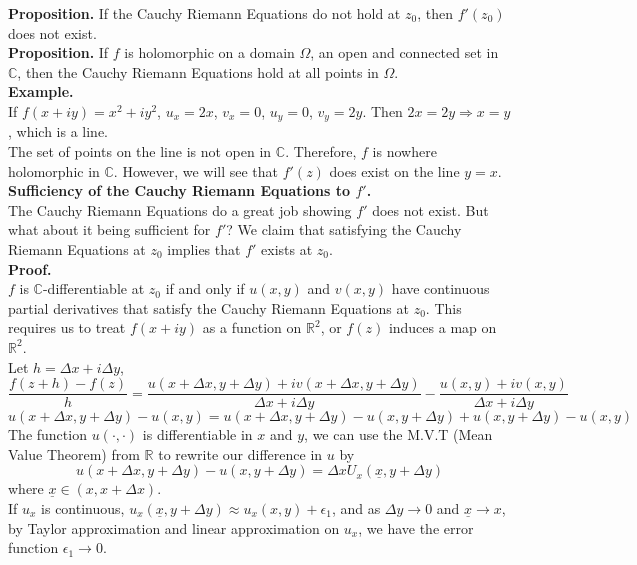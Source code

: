 \documentclass[11pt]{article}
\begin{document}
\textbf{Proposition.} If the Cauchy Riemann Equations do not hold at $z_0$, then $f'(z_0)$ does not exist. \\
\textbf{Proposition.} If $f$ is holomorphic on a domain $\Omega$, an open and connected set in $\mathbb{C}$, then the Cauchy Riemann Equations hold at all points in $\Omega$. \\
\newline
\textbf{Example.} \\
If $f(x + iy) = x^2 + iy^2$, $u_x = 2x$, $v_x = 0$, $u_y = 0$, $v_y = 2y$. Then $2x = 2y \Rightarrow x = y$, which is a line. \\
The set of points on the line is not open in $\mathbb{C}$. Therefore, $f$ is nowhere holomorphic in $\mathbb{C}$. However, we will see that $f'(z)$ does exist on the line $y = x$. \\
\newline
\textbf{Sufficiency of the Cauchy Riemann Equations to $f'$.} \\
The Cauchy Riemann Equations do a great job showing $f'$ does not exist. But what about it being sufficient for $f'$? We claim that satisfying the Cauchy Riemann Equations at $z_0$ implies that $f'$ exists at $z_0$. \\
\textbf{Proof.}\\
$f$ is $\mathbb{C}$-differentiable at $z_0$ if and only if $u(x, y)$ and $v(x, y)$ have continuous partial derivatives that satisfy the Cauchy Riemann Equations at $z_0$. 
This requires us to treat $f(x + iy)$ as a function on $\mathbb{R} ^ 2$, or $f(z)$ induces a map on $\mathbb{R} ^ 2$. \\
Let $ h = \Delta x + i\Delta y$, 
$$ \frac{f(z + h) - f(z)}{h} = \frac{u(x + \Delta x, y + \Delta y) + iv(x + \Delta x, y + \Delta y)}{\Delta x + i \Delta y} - \frac{u(x, y) + iv(x, y)}{\Delta x + i \Delta y}$$
$$u(x + \Delta x, y + \Delta y) - u(x, y) = u(x + \Delta x, y + \Delta y) - u(x, y + \Delta y) + u(x, y + \Delta y) - u(x, y)$$ 
The function $u(\cdot, \cdot)$ is differentiable in $x$ and $y$, we can use the M.V.T (Mean Value Theorem) from $\mathbb{R}$ to rewrite our difference in $u$ by \\
$$u(x + \Delta x, y + \Delta y) - u(x, y + \Delta y) = \Delta xU_x(\underline x, y + \Delta y)$$
where $\underline x \in (x, x + \Delta x)$. \\
\newline 
If $u_x$ is continuous, $u_x(\underline x, y + \Delta y) \approx u_x(x, y) + \epsilon_1$, and as $\Delta y \to 0$ and $\underline x \to x$, by Taylor approximation and linear approximation on $u_x$, we have the error function $\epsilon_1 \to 0$. \\
\end{document}
